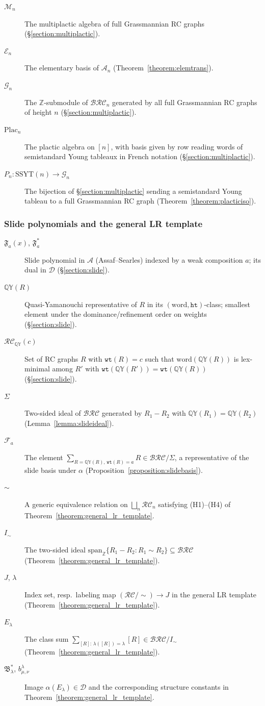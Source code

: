 \documentclass[a4paper,fleqn]{cas-sc}
\theoremstyle{definition}
\theoremstyle{remark}
\numberwithin{equation}{subsection}
\newcommand{\wtt}{\mathtt{wt}}
\newcommand{\QY}{\ensuremath{\mathbb{QY}}}
\newcommand{\grass}{\mathcal{G}}
\newcommand{\plac}{\mathrm{Plac}}
\newcommand{\hr}{\mathtt{ht}}
\newcommand{\BRC}{\mathcal{BRC}}
\newcommand{\RC}{\mathcal{RC}}
\newcommand{\coma}{\mathcal{A}}
\newcommand{\dcoma}{\mathcal{D}}
\begin{document}
\begin{description}
\item[$\mathcal{M}_n$] The multiplactic algebra of full Grassmannian RC graphs (\S\ref{section:multiplactic}).
\item[$\mathcal{E}_n$] The elementary basis of $\coma_n$ (Theorem~\ref{theorem:elemtrans}).
\item[$\grass_n$] The $\mathbb{Z}$-submodule of $\BRC_n$ generated by all full Grassmannian RC graphs of height $n$ (\S\ref{section:multiplactic}).
\item[$\plac_n$] The plactic algebra on $[n]$, with basis given by row reading words of semistandard Young tableaux in French notation (\S\ref{section:multiplactic}).
\item[$P_n:\mathrm{SSYT}(n)\to\grass_n$] The bijection of \S\ref{section:multiplactic} sending a semistandard Young tableau to a full Grassmannian RC graph (Theorem~\ref{theorem:placticiso}).
\end{description}

\subsubsection*{Slide polynomials and the general LR template}
\begin{description}
\item[$\mathfrak{F}_a(x)$, $\mathfrak{F}_a^*$] Slide polynomial in $\coma$ (Assaf--Searles) indexed by a weak composition $a$; its dual in $\dcoma$ (\S\ref{section:slide}).
\item[$\QY(R)$] Quasi-Yamanouchi representative of $R$ in its $(\mathrm{word},\hr)$-class; smallest element under the dominance/refinement order on weights (\S\ref{section:slide}).
\item[$\RC_\QY(c)$] Set of RC graphs $R$ with $\wtt(R)=c$ such that $\mathrm{word}(\QY(R))$ is lex-minimal among $R'$ with $\wtt(\QY(R'))=\wtt(\QY(R))$ (\S\ref{section:slide}).
\item[$\Sigma$] Two-sided ideal of $\BRC$ generated by $R_1-R_2$ with $\QY(R_1)=\QY(R_2)$ (Lemma~\ref{lemma:slideideal}).
\item[$\mathcal{F}_a$] The element $\sum_{R=\QY(R),\,\wtt(R)=a} R\in\BRC/\Sigma$, a representative of the slide basis under $\alpha$ (Proposition~\ref{proposition:slidebasis}).
\item[$\sim$] A generic equivalence relation on $\bigsqcup_n\RC_n$ satisfying (H1)--(H4) of Theorem~\ref{theorem:general_lr_template}.
\item[$I_\sim$] The two-sided ideal $\mathrm{span}_{\mathbb{Z}}\{R_1-R_2:R_1\sim R_2\}\subseteq\BRC$ (Theorem~\ref{theorem:general_lr_template}).
\item[$J$, $\lambda$] Index set, resp.\ labeling map $(\RC/\!\sim)\to J$ in the general LR template (Theorem~\ref{theorem:general_lr_template}).
\item[$E_\lambda$] The class sum $\sum_{[R]:\,\lambda([R])=\lambda}[R]\in\BRC/I_\sim$ (Theorem~\ref{theorem:general_lr_template}).
\item[$\mathfrak{B}_\lambda^*$, $b_{\mu,\nu}^\lambda$] Image $\alpha(E_\lambda)\in\dcoma$ and the corresponding structure constants in Theorem~\ref{theorem:general_lr_template}.
\end{description}
\end{document}
